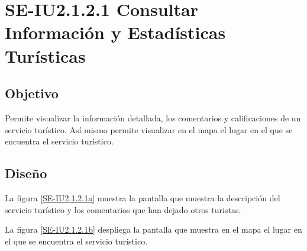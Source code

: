 \newpage
\section{SE-IU2.1.2.1 Consultar Información y Estadísticas Turísticas}

\subsection{Objetivo}
Permite visualizar la información detallada, los comentarios y calificaciones de un servicio turístico. Así mismo permite visualizar en el mapa el lugar en el que se encuentra el servicio turístico.

\subsection{Diseño}
La figura \ref{SE-IU2.1.2.1a} muestra la pantalla  que muestra la descripción del servicio turístico y los comentarios que han dejado otros turistas.


\newpage
La figura \ref{SE-IU2.1.2.1b} despliega la pantalla  que muestra en el mapa el lugar en el que se encuentra el servicio turístico.
